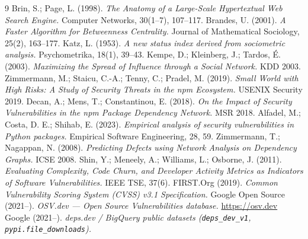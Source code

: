 \documentclass[11pt,a4paper]{article}
\begin{document}
\begin{thebibliography}{9}
\small
{} Brin, S.; Page, L. (1998). \emph{The Anatomy of a Large-Scale
Hypertextual Web Search Engine.} Computer Networks, 30(1--7), 107--117.
 Brandes, U. (2001). \emph{A Faster Algorithm for Betweenness
Centrality.} Journal of Mathematical Sociology, 25(2), 163--177.
 Katz, L. (1953). \emph{A new status index derived from sociometric
analysis.} Psychometrika, 18(1), 39--43.
 Kempe, D.; Kleinberg, J.; Tardos, É. (2003). \emph{Maximizing the
Spread of Influence through a Social Network.} KDD 2003.
 Zimmermann, M.; Staicu, C.-A.; Tenny, C.; Pradel, M. (2019).
\emph{Small World with High Risks: A Study of Security Threats in the npm Ecosystem.}
USENIX Security 2019.
 Decan, A.; Mens, T.; Constantinou, E. (2018). \emph{On the Impact of
Security Vulnerabilities in the npm Package Dependency Network.} MSR 2018.
 Alfadel, M.; Costa, D. E.; Shihab, E. (2023). \emph{Empirical
analysis of security vulnerabilities in Python packages.} Empirical Software
Engineering, 28, 59.
 Zimmermann, T.; Nagappan, N. (2008). \emph{Predicting Defects
using Network Analysis on Dependency Graphs.} ICSE 2008.
 Shin, Y.; Meneely, A.; Williams, L.; Osborne, J. (2011).
\emph{Evaluating Complexity, Code Churn, and Developer Activity Metrics as Indicators
of Software Vulnerabilities.} IEEE TSE, 37(6).
 FIRST.Org (2019). \emph{Common Vulnerability Scoring System (CVSS) v3.1
Specification.}
 Google Open Source (2021--). \emph{OSV.dev --- Open Source
Vulnerabilities database.} \url{https://osv.dev}
 Google (2021--). \emph{deps.dev / BigQuery public datasets
(\texttt{deps\_dev\_v1}, \texttt{pypi.file\_downloads}).}
\end{thebibliography}
\end{document}
